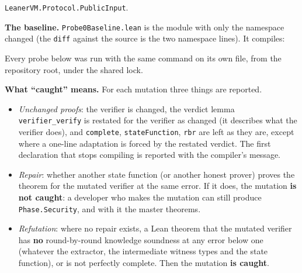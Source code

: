 \texttt{L\allowbreak{}e\allowbreak{}a\allowbreak{}n\allowbreak{}e\allowbreak{}r\allowbreak{}V\allowbreak{}M\allowbreak{}.\allowbreak{}P\allowbreak{}r\allowbreak{}o\allowbreak{}t\allowbreak{}o\allowbreak{}c\allowbreak{}o\allowbreak{}l\allowbreak{}.\allowbreak{}P\allowbreak{}u\allowbreak{}b\allowbreak{}l\allowbreak{}i\allowbreak{}c\allowbreak{}I\allowbreak{}n\allowbreak{}p\allowbreak{}u\allowbreak{}t}.

\textbf{The baseline.} \texttt{Probe0Baseline.\allowbreak{}lean} is the module with only the namespace changed (the \texttt{diff} against the source is the two namespace lines). It compiles:


Every probe below was run with the same command on its own file, from the repository root, under the shared lock.

\textbf{What \enquote{caught} means.} For each mutation three things are reported.

\begin{itemize}
\item \emph{Unchanged proofs}: the verifier is changed, the verdict lemma \texttt{verifier\_\allowbreak{}verify} is restated for the verifier as changed (it describes what the verifier does), and \texttt{complete}, \texttt{stateFunction}, \texttt{rbr} are left as they are, except where a one-line adaptation is forced by the restated verdict. The first declaration that stops compiling is reported with the compiler's message.
\item \emph{Repair}: whether another state function (or another honest prover) proves the theorem for the mutated verifier at the same error. If it does, the mutation \textbf{is not caught}: a developer who makes the mutation can still produce \texttt{Phase.\allowbreak{}Security}, and with it the master theorems.
\item \emph{Refutation}: where no repair exists, a Lean theorem that the mutated verifier has \textbf{no} round-by-round knowledge soundness at any error below one (whatever the extractor, the intermediate witness types and the state function), or is not perfectly complete. Then the mutation \textbf{is caught}.
\end{itemize}

